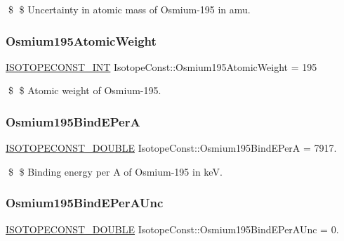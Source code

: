 \$ \$ Uncertainty in atomic mass of Osmium-\/195 in amu. \mbox{\label{group___isotope_const-_osmium-_os195_gae5cca888050e95ed174e97ff97b10516}} 
\subsubsection{\texorpdfstring{Osmium195\+Atomic\+Weight}{Osmium195AtomicWeight}}
{\footnotesize\ttfamily \mbox{\hyperlink{group___isotope_const-_macros_ga5f18360b3e99483a35c32d789e62621c}{I\+S\+O\+T\+O\+P\+E\+C\+O\+N\+S\+T\+\_\+\+I\+NT}} Isotope\+Const\+::\+Osmium195\+Atomic\+Weight = 195}

\$ \$ Atomic weight of Osmium-\/195. \mbox{\label{group___isotope_const-_osmium-_os195_ga433f07fe5cc899d0ca8845ada44270ee}} 
\subsubsection{\texorpdfstring{Osmium195\+Bind\+E\+PerA}{Osmium195BindEPerA}}
{\footnotesize\ttfamily \mbox{\hyperlink{group___isotope_const-_macros_ga8f45a7272ce02c0b4c65c44636ed719a}{I\+S\+O\+T\+O\+P\+E\+C\+O\+N\+S\+T\+\_\+\+D\+O\+U\+B\+LE}} Isotope\+Const\+::\+Osmium195\+Bind\+E\+PerA = 7917.}

\$ \$ Binding energy per A of Osmium-\/195 in keV. \mbox{\label{group___isotope_const-_osmium-_os195_ga373c29bf595194acf5bd96c6cb729d4c}} 
\subsubsection{\texorpdfstring{Osmium195\+Bind\+E\+Per\+A\+Unc}{Osmium195BindEPerAUnc}}
{\footnotesize\ttfamily \mbox{\hyperlink{group___isotope_const-_macros_ga8f45a7272ce02c0b4c65c44636ed719a}{I\+S\+O\+T\+O\+P\+E\+C\+O\+N\+S\+T\+\_\+\+D\+O\+U\+B\+LE}} Isotope\+Const\+::\+Osmium195\+Bind\+E\+Per\+A\+Unc = 0.}

